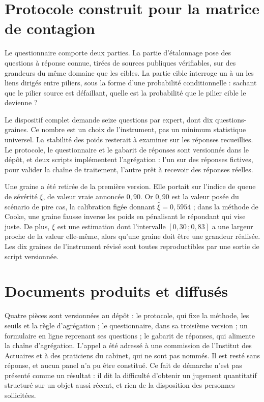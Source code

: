 \section{Protocole construit pour la matrice de contagion}

Le questionnaire comporte deux parties. La partie d'étalonnage pose des questions à réponse connue, tirées
de sources publiques vérifiables, sur des grandeurs du même domaine que les cibles. La partie cible
interroge un à un les liens dirigés entre piliers, sous la forme d'une probabilité conditionnelle : sachant
que le pilier source est défaillant, quelle est la probabilité que le pilier cible le devienne ?

Le dispositif complet demande seize questions par expert, dont dix questions-graines. Ce nombre est un choix de l'instrument, pas un minimum statistique universel. La stabilité des poids resterait à examiner sur les réponses recueillies. Le protocole, le questionnaire et le gabarit de réponses
sont versionnés dans le dépôt, et deux scripts implémentent l'agrégation : l'un sur des réponses fictives,
pour valider la chaîne de traitement, l'autre prêt à recevoir des réponses réelles.

Une graine a été retirée de la première version. Elle portait sur l'indice de queue de sévérité
$\xi$, de valeur vraie annoncée $0{,}90$. Or $0{,}90$ est la valeur posée du scénario de pire cas, la
calibration figée donnant $\hat\xi = 0{,}5954$ ; dans la méthode de Cooke, une graine fausse inverse
les poids en pénalisant le répondant qui vise juste. De plus, $\xi$ est une estimation dont
l'intervalle $[0{,}30\,;0{,}83]$ a une largeur proche de la valeur elle-même, alors qu'une graine doit
être une grandeur réalisée. Les dix graines de l'instrument révisé sont toutes reproductibles par une
sortie de script versionnée.

\section{Documents produits et diffusés}

Quatre pièces sont versionnées au dépôt : le protocole, qui fixe la méthode, les seuils et la règle
d'agrégation ; le questionnaire, dans sa troisième version ; un formulaire en ligne reprenant ses
questions ; le gabarit de réponses, qui alimente la chaîne d'agrégation. L'appel a été adressé à une
commission de l'Institut des Actuaires et à des praticiens du cabinet, qui ne sont pas nommés. Il est
resté sans réponse, et aucun panel n'a pu être constitué. Ce fait de démarche n'est pas présenté comme
un résultat : il dit la difficulté d'obtenir un jugement quantitatif structuré sur un objet aussi
récent, et rien de la disposition des personnes sollicitées.

